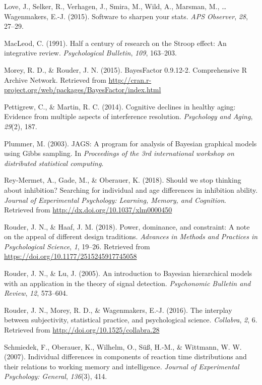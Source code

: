 \documentclass[english,man]{apa6}
\theoremstyle{definition}
\theoremstyle{definition}
\theoremstyle{definition}
\theoremstyle{remark}
\begin{document}
\hypertarget{ref-Love:etal:2015}{}
Love, J., Selker, R., Verhagen, J., Smira, M., Wild, A., Marsman, M.,
\ldots{} Wagenmakers, E.-J. (2015). Software to sharpen your stats.
\emph{APS Observer}, \emph{28}, 27--29.

\hypertarget{ref-MacLeod:1991}{}
MacLeod, C. (1991). Half a century of research on the Stroop effect: An
integrative review. \emph{Psychological Bulletin}, \emph{109}, 163--203.

\hypertarget{ref-Morey:Rouder:BayesFactorPackage}{}
Morey, R. D., \& Rouder, J. N. (2015). BayesFactor 0.9.12-2.
Comprehensive R Archive Network. Retrieved from
\url{http://cran.r-project.org/web/packages/BayesFactor/index.html}

\hypertarget{ref-Pettigrew:Martin:2014}{}
Pettigrew, C., \& Martin, R. C. (2014). Cognitive declines in healthy
aging: Evidence from multiple aspects of interference resolution.
\emph{Psychology and Aging}, \emph{29}(2), 187.

\hypertarget{ref-Plummer:2003}{}
Plummer, M. (2003). JAGS: A program for analysis of Bayesian graphical
models using Gibbs sampling. In \emph{Proceedings of the 3rd
international workshop on distributed statistical computing}.

\hypertarget{ref-ReyMermet:etal:2018}{}
Rey-Mermet, A., Gade, M., \& Oberauer, K. (2018). Should we stop
thinking about inhibition? Searching for individual and age differences
in inhibition ability. \emph{Journal of Experimental Psychology:
Learning, Memory, and Cognition}. Retrieved from
\url{http://dx.doi.org/10.1037/xlm0000450}

\hypertarget{ref-Rouder:Haaf:2018a}{}
Rouder, J. N., \& Haaf, J. M. (2018). Power, dominance, and constraint:
A note on the appeal of different design traditions. \emph{Advances in
Methods and Practices in Psychological Science}, \emph{1}, 19--26.
Retrieved from \url{https://doi.org/10.1177/2515245917745058}

\hypertarget{ref-Rouder:Lu:2005}{}
Rouder, J. N., \& Lu, J. (2005). An introduction to Bayesian
hierarchical models with an application in the theory of signal
detection. \emph{Psychonomic Bulletin and Review}, \emph{12}, 573--604.

\hypertarget{ref-Rouder:etal:2016b}{}
Rouder, J. N., Morey, R. D., \& Wagenmakers, E.-J. (2016). The interplay
between subjectivity, statistical practice, and psychological science.
\emph{Collabra}, \emph{2}, 6. Retrieved from
\url{http://doi.org/10.1525/collabra.28}

\hypertarget{ref-Schmiedek:etal:2007}{}
Schmiedek, F., Oberauer, K., Wilhelm, O., Süß, H.-M., \& Wittmann, W. W.
(2007). Individual differences in components of reaction time
distributions and their relations to working memory and intelligence.
\emph{Journal of Experimental Psychology: General}, \emph{136}(3), 414.
\end{document}
